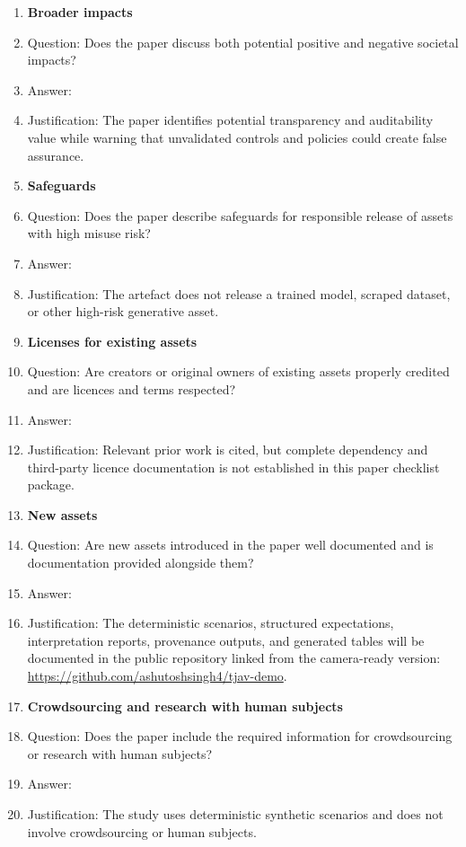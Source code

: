 \begin{enumerate}
\item {\bf Broader impacts}
\item[] Question: Does the paper discuss both potential positive and negative societal impacts?
\item[] Answer: \answerYes{}
\item[] Justification: The paper identifies potential transparency and auditability value while warning that unvalidated controls and policies could create false assurance.

\item {\bf Safeguards}
\item[] Question: Does the paper describe safeguards for responsible release of assets with high misuse risk?
\item[] Answer: \answerNA{}
\item[] Justification: The artefact does not release a trained model, scraped dataset, or other high-risk generative asset.

\item {\bf Licenses for existing assets}
\item[] Question: Are creators or original owners of existing assets properly credited and are licences and terms respected?
\item[] Answer: \answerNo{}
\item[] Justification: Relevant prior work is cited, but complete dependency and third-party licence documentation is not established in this paper checklist package.

\item {\bf New assets}
\item[] Question: Are new assets introduced in the paper well documented and is documentation provided alongside them?
\item[] Answer: \answerYes{}
\item[] Justification: The deterministic scenarios, structured expectations, interpretation reports, provenance outputs, and generated tables will be documented in the public repository linked from the camera-ready version: \url{https://github.com/ashutoshsingh4/tjav-demo}.

\item {\bf Crowdsourcing and research with human subjects}
\item[] Question: Does the paper include the required information for crowdsourcing or research with human subjects?
\item[] Answer: \answerNA{}
\item[] Justification: The study uses deterministic synthetic scenarios and does not involve crowdsourcing or human subjects.


\end{enumerate}
